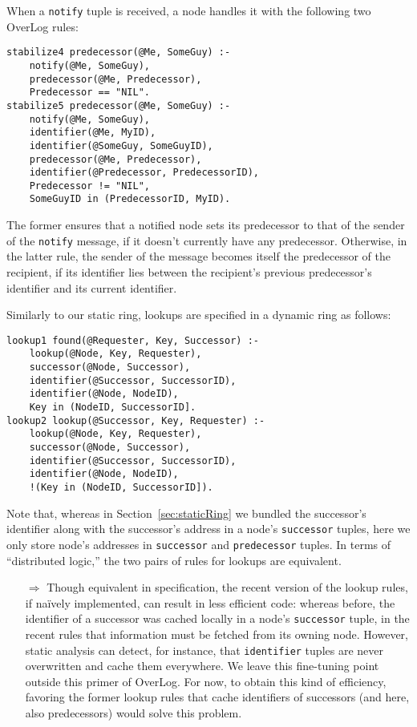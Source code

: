 \documentclass{article}
\begin{document}
When a \lstinline$notify$ tuple is received, a node handles it with the
following two OverLog rules:
\begin{lstlisting}
stabilize4 predecessor(@Me, SomeGuy) :-
	notify(@Me, SomeGuy),
	predecessor(@Me, Predecessor),
	Predecessor == "NIL".
stabilize5 predecessor(@Me, SomeGuy) :-
	notify(@Me, SomeGuy),
	identifier(@Me, MyID),
	identifier(@SomeGuy, SomeGuyID),
	predecessor(@Me, Predecessor),
	identifier(@Predecessor, PredecessorID),
	Predecessor != "NIL",
	SomeGuyID in (PredecessorID, MyID).
\end{lstlisting}
The former ensures that a notified node sets its predecessor to that of
the sender of the \lstinline$notify$ message, if it doesn't currently
have any predecessor. Otherwise, in the latter rule, the sender of the
message becomes itself the predecessor of the recipient, if its
identifier lies between the recipient's previous predecessor's identifier and its
current identifier.

Similarly to our static ring, lookups are specified in a dynamic ring as
follows:
\begin{lstlisting}
lookup1 found(@Requester, Key, Successor) :-
	lookup(@Node, Key, Requester),
	successor(@Node, Successor),
	identifier(@Successor, SuccessorID),
	identifier(@Node, NodeID),
	Key in (NodeID, SuccessorID].
lookup2 lookup(@Successor, Key, Requester) :-
	lookup(@Node, Key, Requester),
	successor(@Node, Successor),
	identifier(@Successor, SuccessorID),
	identifier(@Node, NodeID),
	!(Key in (NodeID, SuccessorID]).
\end{lstlisting}
Note that, whereas in Section~\ref{sec:staticRing} we bundled the
successor's identifier along with the successor's address in a node's
\lstinline$successor$ tuples, here we only store node's addresses in
\lstinline$successor$ and \lstinline$predecessor$ tuples. In terms of
``distributed logic,'' the two pairs of rules for lookups are equivalent.

\begin{itemize}
\item[$\Longrightarrow$] Though equivalent in specification, the recent
  version of the lookup rules, if na\"{i}vely implemented, can result in
  less efficient code: whereas before, the identifier of a successor was
  cached locally in a node's \lstinline$successor$ tuple, in the recent
  rules that information must be fetched from its owning node.  However,
  static analysis can detect, for instance, that \lstinline$identifier$
  tuples are never overwritten and cache them everywhere. We leave this
  fine-tuning point outside this primer of OverLog. For now, to obtain
  this kind of efficiency, favoring the former lookup rules that cache
  identifiers of successors (and here, also predecessors) would solve
  this problem.
\end{itemize}
\end{document}
